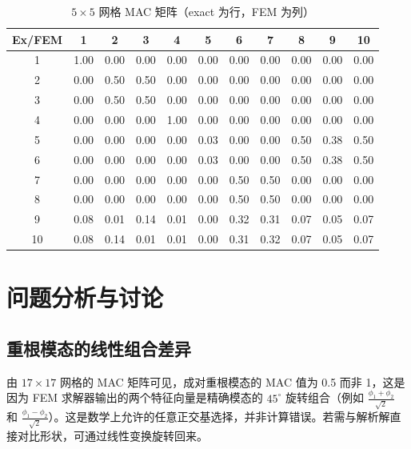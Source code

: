 \documentclass[12pt,a4paper]{article}
\begin{document}
\begin{table}[htbp]
\centering
\caption{$5\times5$ 网格 MAC 矩阵（exact 为行，FEM 为列）}
\label{tab:mac_5}
\begin{tabular}{ccccccccccc}
\toprule
Ex/FEM & 1 & 2 & 3 & 4 & 5 & 6 & 7 & 8 & 9 & 10\\
\midrule
1 & \cellcolor{yellow!30}1.00 & 0.00 & 0.00 & 0.00 & 0.00 & 0.00 & 0.00 & 0.00 & 0.00 & 0.00\\
2 & 0.00 & \cellcolor{yellow!30}0.50 & \cellcolor{yellow!30}0.50 & 0.00 & 0.00 & 0.00 & 0.00 & 0.00 & 0.00 & 0.00\\
3 & 0.00 & \cellcolor{yellow!30}0.50 & \cellcolor{yellow!30}0.50 & 0.00 & 0.00 & 0.00 & 0.00 & 0.00 & 0.00 & 0.00\\
4 & 0.00 & 0.00 & 0.00 & \cellcolor{yellow!30}1.00 & 0.00 & 0.00 & 0.00 & 0.00 & 0.00 & 0.00\\
5 & 0.00 & 0.00 & 0.00 & 0.00 & \cellcolor{yellow!30}0.03 & 0.00 & 0.00 & \cellcolor{yellow!30}0.50 & \cellcolor{yellow!30}0.38 & \cellcolor{yellow!30}0.50\\
6 & 0.00 & 0.00 & 0.00 & 0.00 & \cellcolor{yellow!30}0.03 & 0.00 & 0.00 & \cellcolor{yellow!30}0.50 & \cellcolor{yellow!30}0.38 & \cellcolor{yellow!30}0.50\\
7 & 0.00 & 0.00 & 0.00 & 0.00 & 0.00 & \cellcolor{yellow!30}0.50 & \cellcolor{yellow!30}0.50 & 0.00 & 0.00 & 0.00\\
8 & 0.00 & 0.00 & 0.00 & 0.00 & 0.00 & \cellcolor{yellow!30}0.50 & \cellcolor{yellow!30}0.50 & 0.00 & 0.00 & 0.00\\
9 & \cellcolor{yellow!30}0.08 & \cellcolor{yellow!30}0.01 & \cellcolor{yellow!30}0.14 & \cellcolor{yellow!30}0.01 & 0.00 & \cellcolor{yellow!30}0.32 & \cellcolor{yellow!30}0.31 & \cellcolor{yellow!30}0.07 & \cellcolor{yellow!30}0.05 & \cellcolor{yellow!30}0.07\\
10& \cellcolor{yellow!30}0.08 & \cellcolor{yellow!30}0.14 & \cellcolor{yellow!30}0.01 & \cellcolor{yellow!30}0.01 & 0.00 & \cellcolor{yellow!30}0.31 & \cellcolor{yellow!30}0.32 & \cellcolor{yellow!30}0.07 & \cellcolor{yellow!30}0.05 & \cellcolor{yellow!30}0.07\\
\bottomrule
\end{tabular}
\end{table}

\section{问题分析与讨论}
\subsection{重根模态的线性组合差异}
由 $17\times17$ 网格的 MAC 矩阵可见，成对重根模态的 MAC 值为 0.5 而非 1，这是因为 FEM 求解器输出的两个特征向量是精确模态的 $45^\circ$ 旋转组合（例如 $\frac{\phi_1+\phi_2}{\sqrt{2}}$ 和 $\frac{\phi_1-\phi_2}{\sqrt{2}}$）。这是数学上允许的任意正交基选择，并非计算错误。若需与解析解直接对比形状，可通过线性变换旋转回来。
\end{document}
